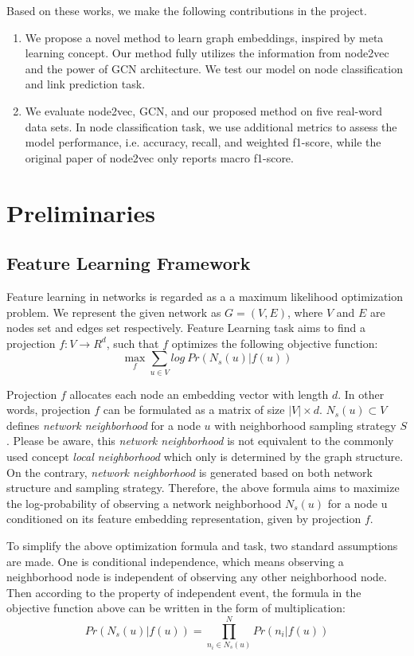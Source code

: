 \documentclass[sigconf]{acmart}
\begin{document}
Based on these works, we make the following contributions in the project.
\begin{enumerate}
    \item We propose a novel method to learn graph embeddings, inspired by meta learning concept. Our method fully utilizes the information from node2vec and the power of GCN architecture. We test our model on node classification and link prediction task.
    \item We evaluate node2vec, GCN, and our proposed method on five real-word data sets. In node classification task, we use additional metrics to assess the model performance, i.e. accuracy, recall, and weighted f1-score, while the original paper of node2vec only reports macro f1-score.
\end{enumerate}



\section{Preliminaries}
\subsection{Feature Learning Framework}
Feature learning in networks is regarded as a a maximum likelihood optimization problem\cite{node2vec}. We represent the given network as $G=(V,E)$, where $V$ and $E$ are nodes set and edges set respectively. Feature Learning task aims to find a projection $f: V \rightarrow R^d$, such that $f$ optimizes the following objective function:
$$\mathop{max}\limits_{f} \sum_{u\in V}log\ Pr(N_s(u)|f(u))$$

Projection $f$ allocates each node an embedding vector with length $d$. In other words, projection $f$ can be formulated as a matrix of size $|V|\times d$. $N_s(u)\subset V$ defines \textit{network neighborhood} for a node $u$ with neighborhood sampling strategy $S$. Please be aware, this \textit{network neighborhood} is not equivalent to the commonly used concept \textit{local neighborhood} which only is determined by the graph structure. On the contrary, \textit{network neighborhood} is generated based on both network structure and sampling strategy. Therefore, the above formula aims to maximize the log-probability of observing a network neighborhood $N_s(u)$ for a node u conditioned on its feature embedding representation, given by projection $f$.

To simplify the above optimization formula and task, two standard assumptions are made. One is conditional independence, which means observing a neighborhood node is independent of observing any other neighborhood node. Then according to the property of independent event, the formula in the objective function above can be written in the form of multiplication:
$$Pr(N_s(u)|f(u))=\prod_{n_i\in N_s(u)}^N Pr(n_i|f(u))$$
\end{document}
